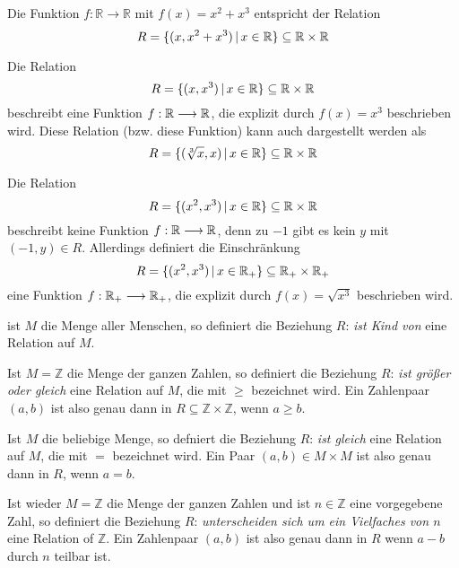 \begin{beispiel}
Die Funktion $f: \mathbb R \longrightarrow \mathbb R$ mit $f(x) = x^2 + x^3$ entspricht der Relation 
	$$ R = \{ (x, x^2+x^3) \, \vert \, x \in \mathbb R \} \subseteq \mathbb R \times \mathbb R $$ 
\end{beispiel}

\begin{beispiel}
Die Relation
	$$ R = \{ (x,x^3) \, \vert \, x \in \mathbb R \} \subseteq \mathbb R \times \mathbb R$$ 
beschreibt eine Funktion $f: \mathbb R \longrightarrow \mathbb R$, die explizit durch $f(x) = x^3$ beschrieben wird. 
Diese Relation (bzw. diese Funktion) kann auch dargestellt werden als 
	$$ R = \{ (\sqrt[3]{x},x) \, \vert \, x \in \mathbb R \} \subseteq \mathbb R \times \mathbb R $$ 
\end{beispiel}

\begin{beispiel}
Die Relation
	$$ R = \{ (x^2,x^3) \, \vert \, x \in \mathbb R \} \subseteq \mathbb R \times \mathbb R $$ 
beschreibt keine Funktion $f: \mathbb R \longrightarrow \mathbb R$, denn zu $-1$ gibt es kein $y$ mit 
$(-1,y) \in R$. Allerdings definiert die Einschränkung 
	$$ R = \{ (x^2,x^3) \, \vert \, x \in \mathbb R_+ \} \subseteq \mathbb R_+ \times \mathbb R_+ $$ 
eine Funktion $f: \mathbb R _+\longrightarrow \mathbb R_+$, die explizit durch $f(x) = \sqrt{x^3}$ beschrieben wird.
\end{beispiel}

\begin{beispiel}\label{relation_kind} ist $M$ die Menge aller Menschen, so definiert die Beziehung $R$: 
\textit{ist Kind von} eine Relation auf $M$.
\end{beispiel}

\begin{beispiel}\label{relation_geq} Ist $M = \mathbb Z$ die Menge der ganzen Zahlen, so definiert die Beziehung $R$: 
\textit{ist größer oder gleich} eine Relation auf $M$, die mit $\geq$ bezeichnet wird. Ein Zahlenpaar 
$(a,b)$ ist also genau dann in $R \subseteq \mathbb Z \times \mathbb Z$, wenn $a \geq b$.
\end{beispiel}

\begin{beispiel}\label{relation_eq} Ist $M$ die beliebige Menge, so defniert die Beziehung $R$: 
\textit{ist  gleich} eine Relation auf $M$, die mit $=$ bezeichnet wird. Ein Paar 
$(a,b) \in M \times M$ ist also genau dann in $R$, wenn $a = b$.
\end{beispiel}


\begin{beispiel}\label{relation_modn} Ist wieder $M = \mathbb Z$ die Menge der ganzen Zahlen und ist $n \in 
\mathbb Z$ eine vorgegebene Zahl, so definiert die Beziehung $R$: \textit{unterscheiden sich um ein 
Vielfaches von $n$} eine Relation of $\mathbb Z$. Ein Zahlenpaar $(a,b)$ ist also genau dann in $R$ wenn $a - b$ 
durch $n$ teilbar ist.
\end{beispiel}

